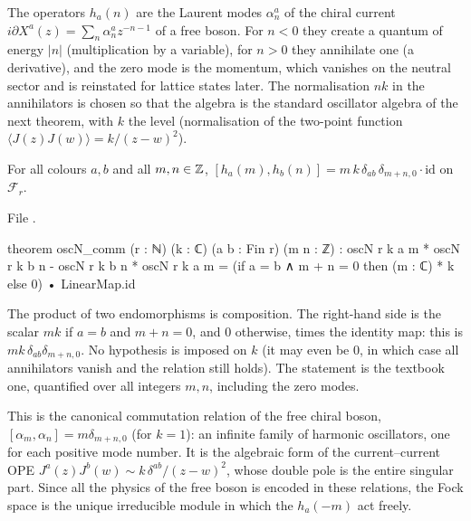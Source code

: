 \begin{physics}
The operators $h_a(n)$ are the Laurent modes $\alpha^a_n$ of the chiral current $i\partial X^a(z)=\sum_n\alpha^a_nz^{-n-1}$ of a free boson. For $n<0$ they create a quantum of energy $|n|$ (multiplication by a variable), for $n>0$ they annihilate one (a derivative), and the zero mode is the momentum, which vanishes on the neutral sector and is reinstated for lattice states later. The normalisation $nk$ in the annihilators is chosen so that the algebra is the standard oscillator algebra of the next theorem, with $k$ the level (normalisation of the two-point function $\langle J(z)J(w)\rangle=k/(z-w)^2$).
\end{physics}

\begin{theorem}\label{ch03:thm:oscN_comm}
For all colours $a,b$ and all $m,n\in{\mathbb{Z}}$,
$[h_a(m),h_b(n)] = m\,k\,\delta_{ab}\,\delta_{m+n,0}\cdot\mathrm{id}$ on $\mathcal F_r$.
\end{theorem}

\noindent File .
\begin{leancode}
theorem oscN_comm (r : ℕ) (k : ℂ) (a b : Fin r) (m n : ℤ) :
    oscN r k a m * oscN r k b n - oscN r k b n * oscN r k a m
      = (if a = b ∧ m + n = 0 then (m : ℂ) * k else 0) • LinearMap.id
\end{leancode}

\begin{dictionary}
The product \lean{*} of two endomorphisms is composition. The right-hand side is the scalar
$mk$ if $a=b$ and $m+n=0$, and $0$ otherwise, times the identity map: this is
$mk\,\delta_{ab}\delta_{m+n,0}$. No hypothesis is imposed on $k$ (it may even be $0$, in which case
all annihilators vanish and the relation still holds). The statement is the textbook one,
quantified over all integers $m,n$, including the zero modes.
\end{dictionary}

\begin{physics}
This is the canonical commutation relation of the free chiral boson, $[\alpha_m,\alpha_n]=m\delta_{m+n,0}$ (for $k=1$): an infinite family of harmonic oscillators, one for each positive mode number. It is the algebraic form of the current--current OPE $J^a(z)J^b(w)\sim k\,\delta^{ab}/(z-w)^2$, whose double pole is the entire singular part. Since all the physics of the free boson is encoded in these relations, the Fock space is the unique irreducible module in which the $h_a(-m)$ act freely.
\end{physics}

